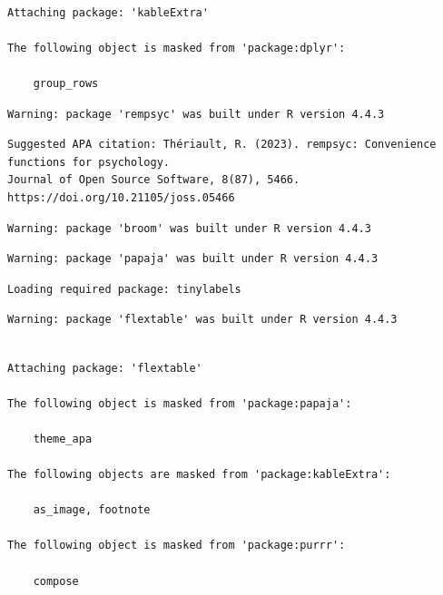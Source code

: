 \documentclass[
]{article}
\begin{document}
\begin{verbatim}

Attaching package: 'kableExtra'

The following object is masked from 'package:dplyr':

    group_rows
\end{verbatim}

\begin{verbatim}
Warning: package 'rempsyc' was built under R version 4.4.3
\end{verbatim}

\begin{verbatim}
Suggested APA citation: Thériault, R. (2023). rempsyc: Convenience functions for psychology. 
Journal of Open Source Software, 8(87), 5466. https://doi.org/10.21105/joss.05466
\end{verbatim}

\begin{verbatim}
Warning: package 'broom' was built under R version 4.4.3
\end{verbatim}

\begin{verbatim}
Warning: package 'papaja' was built under R version 4.4.3
\end{verbatim}

\begin{verbatim}
Loading required package: tinylabels
\end{verbatim}

\begin{verbatim}
Warning: package 'flextable' was built under R version 4.4.3
\end{verbatim}

\begin{verbatim}

Attaching package: 'flextable'

The following object is masked from 'package:papaja':

    theme_apa

The following objects are masked from 'package:kableExtra':

    as_image, footnote

The following object is masked from 'package:purrr':

    compose
\end{verbatim}
\end{document}

